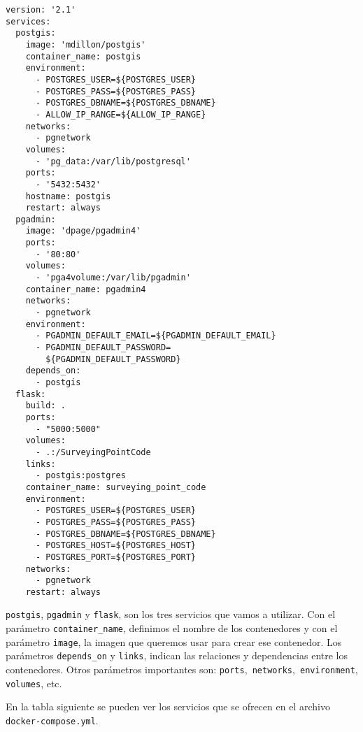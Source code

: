 \begin{lstlisting}
version: '2.1'
services:
  postgis:
    image: 'mdillon/postgis'
    container_name: postgis
    environment:
      - POSTGRES_USER=${POSTGRES_USER}
      - POSTGRES_PASS=${POSTGRES_PASS}
      - POSTGRES_DBNAME=${POSTGRES_DBNAME}
      - ALLOW_IP_RANGE=${ALLOW_IP_RANGE}
    networks:
      - pgnetwork
    volumes:
      - 'pg_data:/var/lib/postgresql'
    ports:
      - '5432:5432'
    hostname: postgis  
    restart: always
  pgadmin:
    image: 'dpage/pgadmin4'
    ports:
      - '80:80'
    volumes:
      - 'pga4volume:/var/lib/pgadmin'
    container_name: pgadmin4
    networks:
      - pgnetwork
    environment:
      - PGADMIN_DEFAULT_EMAIL=${PGADMIN_DEFAULT_EMAIL}
      - PGADMIN_DEFAULT_PASSWORD=
      	${PGADMIN_DEFAULT_PASSWORD}
    depends_on:
      - postgis
  flask:
    build: . 
    ports:
      - "5000:5000"
    volumes:
      - .:/SurveyingPointCode
    links:
      - postgis:postgres 
    container_name: surveying_point_code
    environment:
      - POSTGRES_USER=${POSTGRES_USER}
      - POSTGRES_PASS=${POSTGRES_PASS}
      - POSTGRES_DBNAME=${POSTGRES_DBNAME}   
      - POSTGRES_HOST=${POSTGRES_HOST}
      - POSTGRES_PORT=${POSTGRES_PORT} 
    networks:
      - pgnetwork
    restart: always  
\end{lstlisting}

\noindent\texttt{postgis}, \texttt{pgadmin} y \texttt{flask}, son los tres servicios que vamos a utilizar. Con el parámetro \texttt{container\_name}, definimos el nombre de los contenedores y con el parámetro \texttt{image}, la imagen que queremos usar para crear ese contenedor. Los parámetros \texttt{depends\_on} y \texttt{links}, indican las relaciones y dependencias entre los contenedores. Otros parámetros importantes son: \texttt{ports},\texttt{ networks},\texttt{ environment},\texttt{ volumes}, etc.


En la tabla siguiente se pueden ver los servicios que se ofrecen en el archivo \texttt{docker-compose.yml}.

